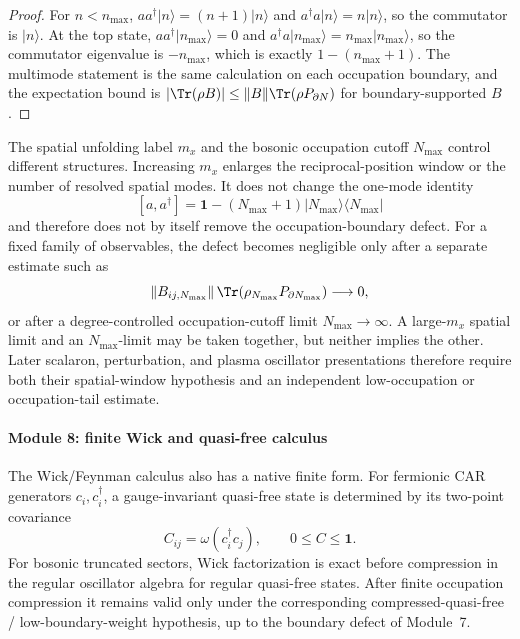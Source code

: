 \documentclass[12pt,a4paper]{article}
\begin{document}
\begin{proof}
For \(n<n_{\max}\), \(aa^\dagger|n\rangle=(n+1)|n\rangle\) and \(a^\dagger a|n\rangle=n|n\rangle\), so the commutator is \(|n\rangle\).  At the top state, \(aa^\dagger|n_{\max}\rangle=0\) and \(a^\dagger a|n_{\max}\rangle=n_{\max}|n_{\max}\rangle\), so the commutator eigenvalue is \(-n_{\max}\), which is exactly \(1-(n_{\max}+1)\).  The multimode statement is the same calculation on each occupation boundary, and the expectation bound is \(|\Tr(\rho B)|\le\|B\|\Tr(\rho P_{\partial N})\) for boundary-supported \(B\).
\end{proof}

\begin{remark}
\label{p4:rem:ccr-defect-meaning}
The spatial unfolding label \(m_x\) and the bosonic occupation cutoff
\(N_{\max}\) control different structures.  Increasing \(m_x\) enlarges the
reciprocal-position window or the number of resolved spatial modes.  It does
not change the one-mode identity
\[
[a,a^\dagger]
=
\mathbf1-(N_{\max}+1)|N_{\max}\rangle\langle N_{\max}|
\]
and therefore does not by itself remove the occupation-boundary defect.
For a fixed family of observables, the defect becomes negligible only after
a separate estimate such as
\[
\|B_{ij,N_{\max}}\|\,
\Tr(\rho_{N_{\max}}P_{\partial N_{\max}})
\longrightarrow0,
\]
or after a degree-controlled occupation-cutoff limit
\(N_{\max}\to\infty\).  A large-\(m_x\) spatial limit and an
\(N_{\max}\)-limit may be taken together, but neither implies the other.
Later scalaron, perturbation, and plasma oscillator presentations therefore
require both their spatial-window hypothesis and an independent
low-occupation or occupation-tail estimate.
\end{remark}

\paragraph{Module 8: finite Wick and quasi-free calculus}
\label{p4:sec:module-finite-wick-calculus}

The Wick/Feynman calculus also has a native finite form.  For fermionic CAR generators \(c_i,c_i^\dagger\), a gauge-invariant quasi-free state is determined by its two-point covariance
\[
C_{ij}=\omega(c_i^\dagger c_j),
\qquad 0\le C\le\mathbf 1.
\]
For bosonic truncated sectors, Wick factorization is exact before compression in the regular oscillator algebra for regular quasi-free states.  After finite occupation compression it remains valid only under the corresponding compressed-quasi-free / low-boundary-weight hypothesis, up to the boundary defect of Module~7.
\end{document}
